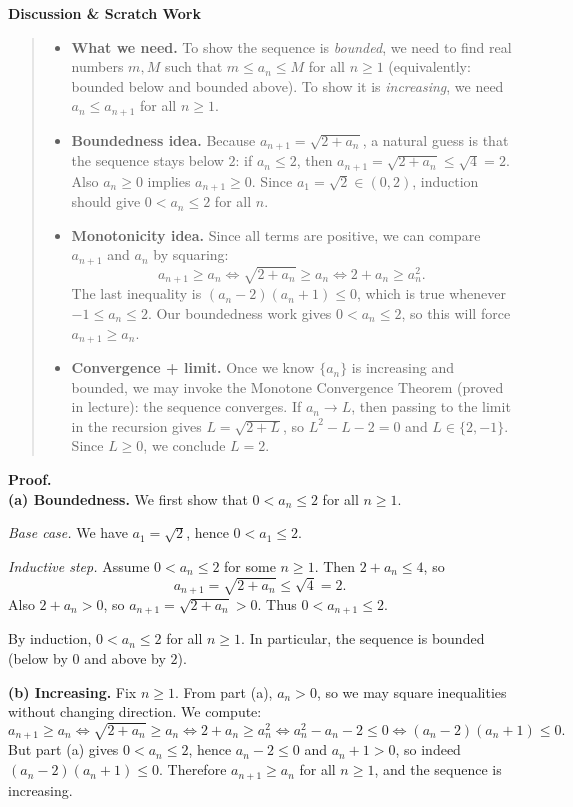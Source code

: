 \documentclass[12pt]{article}
\newenvironment{scratch}{%
  \par\smallskip
  \noindent\textbf{Discussion \& Scratch Work}\begin{quote}\small
}{%
  \end{quote}\smallskip
}
\begin{document}
\begin{scratch}
\begin{itemize}
\item \textbf{What we need.} To show the sequence is \emph{bounded}, we need to find real numbers $m,M$ such that
$m\le a_n\le M$ for all $n\ge 1$ (equivalently: bounded below and bounded above). To show it is \emph{increasing}, we need $a_n\le a_{n+1}$ for all $n\ge 1$.

\item \textbf{Boundedness idea.} Because $a_{n+1}=\sqrt{2+a_n}$, a natural guess is that the sequence stays below $2$:
if $a_n\le 2$, then $a_{n+1}=\sqrt{2+a_n}\le \sqrt{4}=2$. Also $a_n\ge 0$ implies $a_{n+1}\ge 0$. Since $a_1=\sqrt2\in(0,2)$, induction should give $0<a_n\le 2$ for all $n$.

\item \textbf{Monotonicity idea.} Since all terms are positive, we can compare $a_{n+1}$ and $a_n$ by squaring:
\[
 a_{n+1}\ge a_n \iff \sqrt{2+a_n}\ge a_n \iff 2+a_n\ge a_n^2.
\]
The last inequality is $(a_n-2)(a_n+1)\le 0$, which is true whenever $-1\le a_n\le 2$. Our boundedness work gives $0<a_n\le 2$, so this will force $a_{n+1}\ge a_n$.

\item \textbf{Convergence + limit.} Once we know $\{a_n\}$ is increasing and bounded, we may invoke the Monotone Convergence Theorem (proved in lecture): the sequence converges. If $a_n\to L$, then passing to the limit in the recursion gives
$L=\sqrt{2+L}$, so $L^2-L-2=0$ and $L\in\{2,-1\}$. Since $L\ge 0$, we conclude $L=2$.
\end{itemize}
\end{scratch}

\textbf{Proof.}\\
\textbf{(a) Boundedness.} We first show that $0<a_n\le 2$ for all $n\ge 1$.

\emph{Base case.} We have $a_1=\sqrt2$, hence $0<a_1\le 2$.

\emph{Inductive step.} Assume $0<a_n\le 2$ for some $n\ge 1$. Then $2+a_n\le 4$, so
\[
 a_{n+1}=\sqrt{2+a_n}\le \sqrt4=2.
\]
Also $2+a_n>0$, so $a_{n+1}=\sqrt{2+a_n}>0$. Thus $0<a_{n+1}\le 2$.

By induction, $0<a_n\le 2$ for all $n\ge 1$. In particular, the sequence is bounded (below by $0$ and above by $2$).

\textbf{(b) Increasing.} Fix $n\ge 1$. From part (a), $a_n>0$, so we may square inequalities without changing direction. We compute:
\[
 a_{n+1}\ge a_n
 \iff \sqrt{2+a_n}\ge a_n
 \iff 2+a_n\ge a_n^2
 \iff a_n^2-a_n-2\le 0
 \iff (a_n-2)(a_n+1)\le 0.
\]
But part (a) gives $0<a_n\le 2$, hence $a_n-2\le 0$ and $a_n+1>0$, so indeed $(a_n-2)(a_n+1)\le 0$. Therefore $a_{n+1}\ge a_n$ for all $n\ge 1$, and the sequence is increasing.
\end{document}

